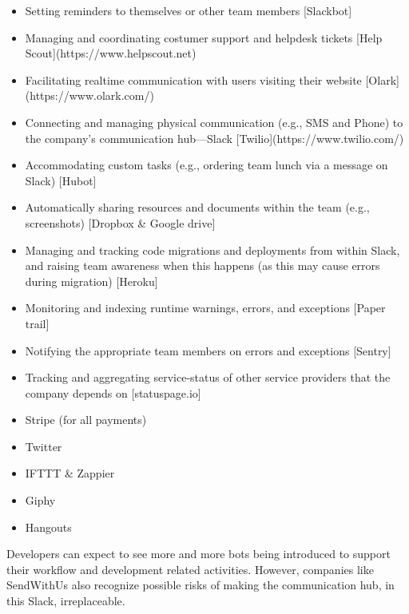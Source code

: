 \documentclass{sig-alternate}
\begin{document}
\begin{itemize} 
\item Setting reminders to themselves or other team members [Slackbot]
\item Managing and coordinating costumer support and helpdesk tickets [Help Scout](https://www.helpscout.net)
\item Facilitating realtime communication with users visiting their website [Olark](https://www.olark.com/)
\item Connecting and managing physical communication (e.g., SMS and Phone) to the company's communication hub---Slack [Twilio](https://www.twilio.com/)
\item Accommodating custom tasks (e.g., ordering team lunch via a message on Slack) [Hubot]
\item Automatically sharing resources and documents within the team (e.g., screenshots) [Dropbox \& Google drive]
\item Managing and tracking code migrations and deployments from within Slack, and raising team awareness when this happens (as this may cause errors during migration) [Heroku]
\item Monitoring and indexing runtime warnings, errors, and exceptions [Paper trail]
\item Notifying the appropriate team members on errors and exceptions [Sentry]
\item Tracking and aggregating service-status of other service providers that the company depends on [statuspage.io]
\item Stripe (for all payments)
\item Twitter
\item IFTTT \& Zappier
\item Giphy
\item Hangouts
\end{itemize}

Developers can expect to see more and more bots being introduced to support their workflow and development related activities. However, companies like SendWithUs also recognize possible risks of making the communication hub, in this Slack, irreplaceable.


\end{document}
